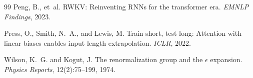 \documentclass[11pt,a4paper]{article}
\begin{document}
\begin{thebibliography}{99}
Peng, B., et~al.
\newblock RWKV: Reinventing RNNs for the transformer era.
\newblock \emph{EMNLP Findings}, 2023.

Press, O., Smith, N.~A., and Lewis, M.
\newblock Train short, test long: Attention with linear biases enables input
  length extrapolation.
\newblock \emph{ICLR}, 2022.

Wilson, K.~G. and Kogut, J.
\newblock The renormalization group and the $\epsilon$ expansion.
\newblock \emph{Physics Reports}, 12(2):75--199, 1974.

\end{thebibliography}
\end{document}
